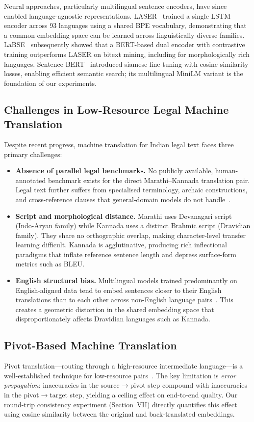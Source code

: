 \documentclass[conference,letterpaper]{IEEEtran}
\begin{document}
Neural approaches, particularly multilingual sentence encoders, have since
enabled language-agnostic representations. LASER~\cite{artetxe2019massively}
trained a single LSTM encoder across 93 languages using a shared BPE
vocabulary, demonstrating that a common embedding space can be learned across
linguistically diverse families. LaBSE~\cite{feng2022labse} subsequently
showed that a BERT-based dual encoder with contrastive training outperforms
LASER on bitext mining, including for morphologically rich languages.
Sentence-BERT~\cite{reimers2019sentencebert} introduced siamese fine-tuning
with cosine similarity losses, enabling efficient semantic search; its
multilingual MiniLM variant is the foundation of our experiments.

\subsection{Challenges in Low-Resource Legal Machine Translation}
Despite recent progress, machine translation for Indian legal text faces
three primary challenges:

\begin{itemize}
    \item \textbf{Absence of parallel legal benchmarks.} No publicly
    available, human-annotated benchmark exists for the direct
    Marathi--Kannada translation pair. Legal text further suffers from
    specialised terminology, archaic constructions, and cross-reference
    clauses that general-domain models do not handle~\cite{prieto2015legal}.
    \item \textbf{Script and morphological distance.} Marathi uses
    Devanagari script (Indo-Aryan family) while Kannada uses a
    distinct Brahmic script (Dravidian family). They share no
    orthographic overlap, making character-level transfer learning
    difficult. Kannada is agglutinative, producing rich inflectional
    paradigms that inflate reference sentence length and depress
    surface-form metrics such as BLEU.
    \item \textbf{English structural bias.} Multilingual models trained
    predominantly on English-aligned data tend to embed sentences
    closer to their English translations than to each other
    across non-English language pairs~\cite{pires2019multibert}. This
    creates a geometric distortion in the shared embedding space that
    disproportionately affects Dravidian languages such as Kannada.
\end{itemize}

\subsection{Pivot-Based Machine Translation}
Pivot translation---routing through a high-resource intermediate
language---is a well-established technique for low-resource
pairs~\cite{utiyama2007pivot,wu2007pivot}. The key limitation is
\textit{error propagation}: inaccuracies in the source$\rightarrow$pivot
step compound with inaccuracies in the pivot$\rightarrow$target step,
yielding a ceiling effect on end-to-end quality. Our round-trip
consistency experiment (Section~VII) directly quantifies this effect
using cosine similarity between the original and back-translated embeddings.
\end{document}
